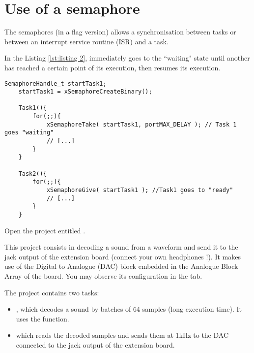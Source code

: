 \section{Use of a semaphore}

The semaphores (in a flag version) allows a synchronisation between tasks or between an interrupt service routine (ISR) and a task.

In the Listing \ref{lst:listing 2},  immediately goes to the ``waiting" state until another  has
reached a certain point of its execution, then  resumes its execution.

\begin{lstlisting}[caption={Semaphore example}, label={lst:listing 2}]
    SemaphoreHandle_t startTask1;
    startTask1 = xSemaphoreCreateBinary();
    
    Task1(){
        for(;;){
            xSemaphoreTake( startTask1, portMAX_DELAY ); // Task 1 goes "waiting"
            // [...]
        }
    }
    
    Task2(){
        for(;;){
            xSemaphoreGive( startTask1 ); //Task1 goes to "ready"
            // [...]
        }
    }
\end{lstlisting}



Open the project entitled .

This project consists in decoding a sound from a waveform and send it to the jack output of the extension board (connect your own headphones !).
It makes use of the Digital to Analogue (DAC) block embedded in the Analogue Block Array of the board.
You may observe its configuration in the  tab.

The project contains two tasks:
\begin{itemize}
    \item {}, which decodes a sound by batches of 64 samples (long execution time). It uses the  function.
    \item {} which reads the decoded samples and sends them at 1kHz to the DAC connected to the jack output of the extension board.
\end{itemize} 

